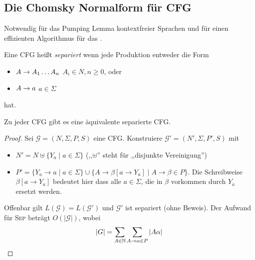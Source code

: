 \subsection{Die Chomsky Normalform für \ac*{CFG}}
Notwendig für das Pumping Lemma kontextfreier Sprachen und für einen effizienten Algorithmus für das .


\begin{Def}
  Eine CFG heißt \emph{separiert} wenn jede Produktion entweder die Form
  \begin{itemize}
  \item $A\-> A_1\dots A_n$ \qquad $A_i\in N,n\geq 0$, oder
  \item $A \-> a$ \quad $a\in\Sigma$
  \end{itemize}
  hat.
\end{Def}

\begin{lemma}
  Zu jeder CFG gibt es eine äquivalente separierte CFG.
\end{lemma}
\begin{proof}
  Sei $\mathcal{G} = (N, \Sigma, P, S)$ eine CFG.
  Konstruiere $\mathcal{G}' = (N', \Sigma, P', S)$ mit
  \begin{itemize}
  \item $N' = N \uplus \{Y_a \mid a \in \Sigma \}$ (,,$\uplus$'' steht für ,,disjunkte Vereinigung'')
  \item $P' = \{Y_a \to a \mid a \in \Sigma \} \cup \{A \to \beta[a \to Y_a] \mid A \to \beta \in P \}$.
    Die Schreibweise $\beta[a\to Y_a]$ bedeutet hier dass alle $a \in \Sigma$, die in $\beta$ vorkommen durch $Y_a$ ersetzt werden.
  \end{itemize}
Offenbar gilt $L(\mathcal{G}) = L(\mathcal{G'})$ und $\mathcal{G}'$ ist separiert (ohne Beweis).
Der Aufwand für \textsc{Sep} beträgt $O(|\mathcal{G}|)$, wobei 
\begin{displaymath}
  |G| = \sum_{A \in \mathbb{N}}\sum_{A \to \alpha \in P} |A\alpha|
\end{displaymath}
\end{proof}

